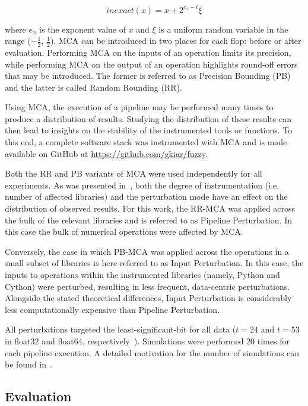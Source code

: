 \documentclass[fleqn,10pt]{SelfArx} %
\begin{document}
\begin{equation}
inexact(x) = x + 2^{e_x - t}\xi 
\label{eq:inexact}
\end{equation}

where $e_x$ is the exponent value of $x$ and $\xi$ is a uniform random variable in the range ($-\frac{1}{2}$,
$\frac{1}{2}$). MCA can be introduced in two places for each flop: before or after evaluation. Performing MCA on the
inputs of an operation limits its precision, while performing MCA on the output of an operation highlights round-off
errors that may be introduced. The former is referred to as Precision Bounding (PB) and the latter is called Random
Rounding (RR).

Using MCA, the execution of a pipeline may be performed many times to produce a distribution of results. Studying the
distribution of these results can then lead to insights on the stability of the instrumented tools or functions. To
this end, a complete software stack was instrumented with MCA and is made available on GitHub at
\url{https://github.com/gkiar/fuzzy}.

Both the RR and PB variants of MCA were used independently for all experiments. As was presented in~\cite{Kiar2020-lb},
both the degree of instrumentation (i.e. number of affected libraries) and the perturbation mode have an effect on the
distribution of observed results. For this work, the RR-MCA was applied across the bulk of the relevant libraries and
is referred to as Pipeline Perturbation. In this case the bulk of numerical operations were affected by MCA.

Conversely, the case in which PB-MCA was applied across the operations in a small subset of libraries is here referred
to as Input Perturbation. In this case, the inputs to operations within the instrumented libraries (namely, Python and
Cython) were perturbed, resulting in less frequent, data-centric perturbations. Alongside the stated theoretical
differences, Input Perturbation is considerably less computationally expensive than Pipeline Perturbation.

All perturbations targeted the least-significant-bit for all data ($t=24$ and $t=53$ in float32 and float64,
respectively~\cite{Denis2016-wo}). Simulations were performed $20$ times for each pipeline execution. A detailed
motivation for the number of simulations can be found in~\cite{Sohier2018-ts}.

\subsection*{Evaluation}
\end{document}
